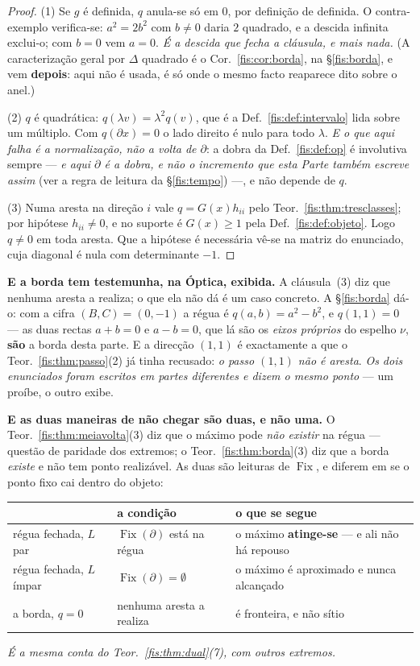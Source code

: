 \documentclass[livro.tex]{subfiles}
\begin{document}
\begin{proof}
(1) Se $g$ é definida, $q$ anula-se só em $0$, por definição de definida. O
contra-exemplo verifica-se: $a^{2}=2b^{2}$ com $b\neq0$ daria $2$ quadrado, e a
descida infinita exclui-o; com $b=0$ vem $a=0$. \emph{É a descida que fecha a
cláusula, e mais nada.} (A caracterização geral por $\Delta$ quadrado é o
Cor.~\ref{fis:cor:borda}, na §\ref{fis:borda}, e vem \textbf{depois}: aqui não é
usada, é só onde o mesmo facto reaparece dito sobre o anel.)

(2) $q$ é quadrática: $q(\lambda v)=\lambda^{2}q(v)$, que é a
Def.~\ref{fis:def:intervalo} lida sobre um múltiplo. Com $q(\partial x)=0$ o lado
direito é nulo para todo $\lambda$. \emph{E o que aqui falha é a normalização,
não a volta de $\partial$}: a dobra da Def.~\ref{fis:def:op} é involutiva sempre
--- \emph{e aqui $\partial$ é a dobra, e não o incremento que esta Parte também
escreve assim} (ver a regra de leitura da §\ref{fis:tempo}) ---,
e não depende de $q$.

(3) Numa aresta na direção $i$ vale $q=G(x)h_{ii}$ pelo
Teor.~\ref{fis:thm:tresclasses}; por hipótese $h_{ii}\neq0$, e no suporte é
$G(x)\ge1$ pela Def.~\ref{fis:def:objeto}. Logo $q\neq0$ em toda aresta. Que a
hipótese é necessária vê-se na matriz do enunciado, cuja diagonal é nula com
determinante $-1$.
\end{proof}

\medskip\noindent\textbf{E a borda tem testemunha, na Óptica, exibida.} A
cláusula~(3) diz que nenhuma aresta a realiza; o que ela não dá é um caso
concreto. A §\ref{fis:borda} dá-o: com a cifra $(B,C)=(0,-1)$ a régua é
$q(a,b)=a^{2}-b^{2}$, e $q(1,1)=0$ --- as duas rectas $a+b=0$ e $a-b=0$, que lá
são os \emph{eixos próprios} do espelho $\nu$, \textbf{são} a borda desta parte.
E a direcção $(1,1)$ é exactamente a que o Teor.~\ref{fis:thm:passo}(2) já tinha
recusado: \emph{o passo $(1,1)$ não é aresta}. \emph{Os dois enunciados foram
escritos em partes diferentes e dizem o mesmo ponto} --- um proíbe, o outro
exibe.

\medskip\noindent\textbf{E as duas maneiras de não chegar são duas, e não uma.} O
Teor.~\ref{fis:thm:meiavolta}(3) diz que o máximo pode \emph{não existir} na
régua --- questão de paridade dos extremos; o Teor.~\ref{fis:thm:borda}(3) diz
que a borda \emph{existe} e não tem ponto realizável. As duas são leituras de
$\operatorname{Fix}$, e diferem em se o ponto fixo cai dentro do objeto:
\begin{center}\small
\begin{tabular}{@{}lll@{}}
\toprule
 & a condição & o que se segue \\
\midrule
régua fechada, $L$ par & $\operatorname{Fix}(\partial)$ está na régua & o máximo \textbf{atinge-se} --- e ali não há repouso \\
régua fechada, $L$ ímpar & $\operatorname{Fix}(\partial)=\emptyset$ & o máximo é aproximado e nunca alcançado \\
a borda, $q=0$ & nenhuma aresta a realiza & é fronteira, e não sítio \\
\bottomrule
\end{tabular}
\end{center}
\emph{É a mesma conta do Teor.~\ref{fis:thm:dual}(7), com outros extremos.}
\end{document}
